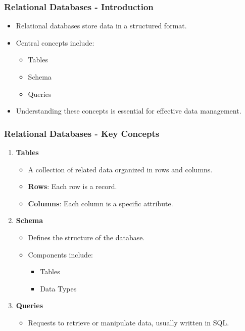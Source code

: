 \documentclass[aspectratio=169]{beamer}
\begin{document}
\begin{frame}[fragile]
    \frametitle{Relational Databases - Introduction}
    \begin{itemize}
        \item Relational databases store data in a structured format.
        \item Central concepts include:
        \begin{itemize}
            \item Tables
            \item Schema
            \item Queries
        \end{itemize}
        \item Understanding these concepts is essential for effective data management.
    \end{itemize}
\end{frame}

\begin{frame}[fragile]
    \frametitle{Relational Databases - Key Concepts}
    \begin{enumerate}
        \item \textbf{Tables}
        \begin{itemize}
            \item A collection of related data organized in rows and columns.
            \item \textbf{Rows}: Each row is a record.
            \item \textbf{Columns}: Each column is a specific attribute.
        \end{itemize}
        \item \textbf{Schema}
        \begin{itemize}
            \item Defines the structure of the database.
            \item Components include:
            \begin{itemize}
                \item Tables
                \item Data Types
            \end{itemize}
        \end{itemize}
        \item \textbf{Queries}
        \begin{itemize}
            \item Requests to retrieve or manipulate data, usually written in SQL.
        \end{itemize}
    \end{enumerate}
\end{frame}
\end{document}
